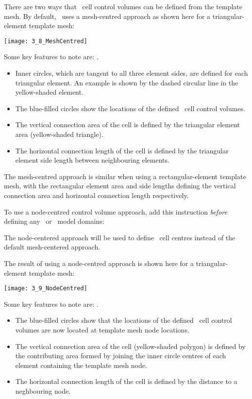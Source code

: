 There are two ways that \mf\ cell control volumes can be defined from the template mesh.  By default, \mut\ uses a mesh-centred approach as shown here for a triangular-element template mesh:

    \texttt{[image: 3\_8\_MeshCentred]}

Some key features to note are:
    \label{page:MeshCentredApproach}
    \label{page:MeshCentredApproach}.
\begin{itemize}
    \item Inner circles, which are tangent to all three element sides, are defined for each triangular element.  An example is shown by the dashed circular line in the yellow-shaded element.
    \item The blue-filled circles show the locations of the defined \mf\ cell control volumes.
    \item The vertical connection area of the cell is defined by the triangular element area (yellow-shaded triangle).
    \item The horizontal connection length of the cell is defined by the triangular element side length between neighbouring elements.
\end{itemize}

The mesh-centred approach is similar when using a  rectangular-element template mesh, with the rectangular element area and side lengths defining the vertical connection area and horizontal connection length respectively.

To use a node-centred control volume approach, add this instruction {\em before} defining any \gwf\ or \swf\ model domains:

    {The node-centered approach will be used to define \mf\ cell centres instead of the default mesh-centered approach.
     }

The result of using a node-centred approach is shown here for a triangular-element template mesh:

    \texttt{[image: 3\_9\_NodeCentred]}

Some key features to note are:
    \label{page:NodeCentredApproach}
    \label{page:NodeCentredApproach}.
\begin{itemize}
    \item The blue-filled circles show that the locations of the defined \mf\ cell control volumes are now located at template mesh node locations.
    \item The vertical connection area of the cell (yellow-shaded polygon) is defined by the contributing area formed by joining the inner circle centres of each element containing the template mesh node.         \label{page:NodeCentredApproach}
    \item The horizontal connection length of the cell is defined by the distance to a neghbouring node.
\end{itemize}




